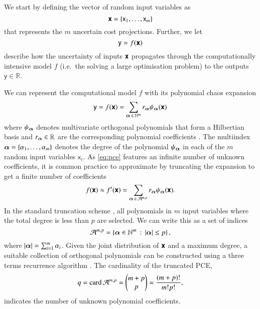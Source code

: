 We start by defining the vector of random input variables as
\begin{equation}
    \boldsymbol{\mathsf{x}} = \{\mathsf{x}_1, \dots , \mathsf{x}_m\}
\end{equation}
that represents the $m$ uncertain cost projections.
Further, we let
\begin{equation}
    \mathsf{y} = f(\boldsymbol{\mathsf{x}})
\end{equation}
describe how the uncertainty of inputs $\boldsymbol{\mathsf{x}}$ propagates
through the computationally intensive model $f$
(i.e.~the solving a large optimisation problem)
to the outputs $\mathsf{y} \in \mathbb{R}$.

We can represent the computational model $f$ with its polynomial chaos expansion
\begin{equation}
    \mathsf{y} = f(\boldsymbol{\mathsf{x}}) = \sum_{{\bm{\alpha}} \,\in\, \mathbb{N}^m} r_{{\bm{\alpha}}} \psi_{{\bm{\alpha}}}(\boldsymbol{\mathsf{x}})
    \label{eq:pce}
\end{equation}
where $\psi_{\bm{\alpha}}$ denotes multivariate orthogonal polynomials that form
a Hilbertian basis and $r_{\bm{\alpha}} \in \mathbb{R}$ are the corresponding polynomial coefficients \cite{sudret_global_2008}. The multiindex ${\bm{\alpha}} = \{\alpha_1,\dots,\alpha_m\}$ 
denotes the degree of the polynomial $\psi_{\bm{\alpha}}$ in each of the $m$ random input variables $\mathsf{x}_i$.
As \cref{eq:pce} features an infinite number of unknown coefficients,
it is common practice to approximate by truncating the expansion to get a finite number of coefficients
\begin{equation}
    f(\boldsymbol{\mathsf{x}}) \approx f'(\boldsymbol{\mathsf{x}}) = \sum_{{\bm{\alpha}} \,\in\, \mathcal{A}^{m,p}} r_{\bm{\alpha}} \psi_{\bm{\alpha}}(\boldsymbol{\mathsf{x}}).
\end{equation}
In the standard truncation scheme \cite{gratiet_metamodel-based_2015,sudret_global_2008},
all polynomials in $m$ input variables where the total degree is less than $p$ are selected.
We can write this as a set of indices
\begin{equation}
    \mathcal{A}^{m,p} = \left\{{\bm{\alpha}} \in \mathbb{N}^m \,:\, \left|{\bm{\alpha}}\right| \leq p\right\},
\end{equation}
where $\left|{\bm{\alpha}}\right| = \sum_{i=1}^m \alpha_i$.
Given the joint distribution of $\boldsymbol{\mathsf{x}}$ and a maximum degree,
a suitable collection of orthogonal polynomials can be constructed
using a three terms recurrence algorithm \cite{feinberg_chaospy_2015}.
The cardinality of the truncated PCE,
\begin{equation}
    q = \text{card}\, \mathcal{A}^{m,p} = \left(\begin{matrix}
        m+p \\
        p
    \end{matrix}\right) = \frac{(m+p)!}{m!p!},
\end{equation}
indicates the number of unknown polynomial coefficients.

